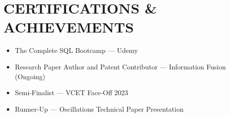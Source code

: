 \section*{CERTIFICATIONS \& ACHIEVEMENTS}

\begin{itemize}
\item The Complete SQL Bootcamp --- Udemy
\item Research Paper Author and Patent Contributor --- Information Fusion (Ongoing)
\item Semi-Finalist --- VCET Face-Off 2023
\item Runner-Up --- Oscillations Technical Paper Presentation
\end{itemize}
